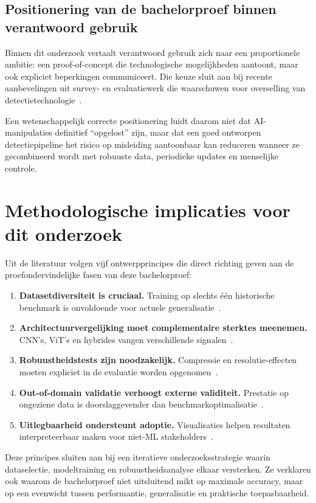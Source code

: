 \subsection{Positionering van de bachelorproef binnen verantwoord gebruik}
Binnen dit onderzoek vertaalt verantwoord gebruik zich naar een proportionele ambitie: een proof-of-concept die technologische mogelijkheden aantoont, maar ook expliciet beperkingen communiceert. Die keuze sluit aan bij recente aanbevelingen uit survey- en evaluatiewerk die waarschuwen voor overselling van detectietechnologie~\autocite{MultimodalSurvey2025,EvaluationModels2025}. 

Een wetenschappelijk correcte positionering luidt daarom niet dat AI-manipulaties definitief ``opgelost'' zijn, maar dat een goed ontworpen detectiepipeline het risico op misleiding aantoonbaar kan reduceren wanneer ze gecombineerd wordt met robuuste data, periodieke updates en menselijke controle.

\section{Methodologische implicaties voor dit onderzoek}
Uit de literatuur volgen vijf ontwerpprincipes die direct richting geven aan de proefondervindelijke fasen van deze bachelorproef:
\begin{enumerate}
  \item \textbf{Datasetdiversiteit is cruciaal.} Training op slechts één historische benchmark is onvoldoende voor actuele generalisatie~\autocite{Pei2024,EvaluationModels2025}.
  \item \textbf{Architectuurvergelijking moet complementaire sterktes meenemen.} CNN's, ViT's en hybrides vangen verschillende signalen~\autocite{Raza2026,CNNViTCompare2026}.
  \item \textbf{Robuustheidstests zijn noodzakelijk.} Compressie en resolutie-effecten moeten expliciet in de evaluatie worden opgenomen~\autocite{CompressionHybrid2025}.
  \item \textbf{Out-of-domain validatie verhoogt externe validiteit.} Prestatie op ongeziene data is doorslaggevender dan benchmarkoptimalisatie~\autocite{OpenSet2025,EvaluationModels2025}.
  \item \textbf{Uitlegbaarheid ondersteunt adoptie.} Visualisaties helpen resultaten interpreteerbaar maken voor niet-ML stakeholders~\autocite{SIDA2025}.
\end{enumerate}

Deze principes sluiten aan bij een iteratieve onderzoeksstrategie waarin dataselectie, modeltraining en robuustheidsanalyse elkaar versterken. Ze verklaren ook waarom de bachelorproef niet uitsluitend mikt op maximale accuracy, maar op een evenwicht tussen performantie, generalisatie en praktische toepasbaarheid.

